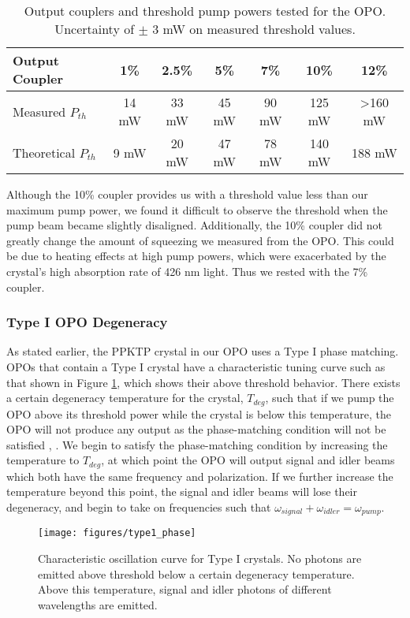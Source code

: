 \begin{table}[ht]
  \centering
  \begin{tabular}{|l|c | c | c | c | c | c |}
    \hline
    Output Coupler  & 1\%  & 2.5\% & 5\% & 7\% & 10\% & 12\%\\
    \hline
    Measured $P_{th}$ & 14 mW & 33 mW & 45 mW & 90 mW & 125 mW  & >160 mW\\
    \hline
    Theoretical $P_{th}$ & 9 mW & 20 mW & 47 mW & 78 mW & 140 mW  & 188 mW\\
    \hline
  \end{tabular}
\caption{Output couplers and threshold pump powers tested for the OPO.  Uncertainty of $\pm$ 3 mW on measured threshold values.}
\label{opo_thresholds}
\end{table}


Although the 10\% coupler provides us with a threshold value less than our maximum pump power, we found it difficult to observe the threshold when the pump beam became slightly disaligned.  Additionally, the 10\% coupler did not greatly change the amount of squeezing we measured from the OPO.  This could be due to heating effects at high pump powers, which were exacerbated by the crystal's high absorption rate of 426 nm light.  Thus we rested with the 7\% coupler.

\subsubsection{Type I OPO Degeneracy}
 
As stated earlier, the PPKTP crystal in our OPO uses a Type I phase matching.
OPOs that contain a Type I crystal have a characteristic tuning curve such as that shown in Figure \ref{fig:type1_deg}, which shows their above threshold behavior.  There exists a certain degeneracy temperature for the crystal, $T_{deg}$, such that if we pump the OPO above its threshold power while the crystal is below this temperature, the OPO will not produce any output as the phase-matching condition will not be satisfied \cite{Eckardt:91}, \cite{LamPhD}.  We begin to satisfy the phase-matching condition by increasing the temperature to $T_{deg}$, at which point the OPO will output signal and idler beams which both have the same frequency and polarization.  If we further increase the temperature beyond this point, the signal and idler beams will lose their degeneracy, and begin to take on frequencies such that $\omega_{signal} + \omega_{idler} = \omega _{pump}$.

\begin{figure}[!htb] 
 \centering 
 \texttt{[image: figures/type1\_phase]} 
 \caption[Type I crystal degeneracy]{Characteristic oscillation curve for Type I crystals.  No photons are emitted above threshold below a certain degeneracy temperature.  Above this temperature, signal and idler photons of different wavelengths are emitted.} 
 \label{fig:type1_deg} 
\end{figure}

